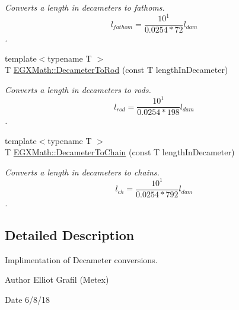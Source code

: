 \begin{DoxyCompactItemize}
\begin{DoxyCompactList}\small\item\em Converts a length in decameters to fathoms. \[ l_{fathom}= \frac{10^{1}}{0.0254 * 72} l_{dam} \]. \end{DoxyCompactList}\item 
{\footnotesize template$<$typename T $>$ }\\T \mbox{\hyperlink{group___e_g_x_math-_conversions-_length_conversions-_s_i-_decameter-_surveyors_ga0a6de708486617662fba474b67c8faa5}{E\+G\+X\+Math\+::\+Decameter\+To\+Rod}} (const T length\+In\+Decameter)
\begin{DoxyCompactList}\small\item\em Converts a length in decameters to rods. \[ l_{rod}= \frac{10^{1}}{0.0254 * 198} l_{dam} \]. \end{DoxyCompactList}\item 
{\footnotesize template$<$typename T $>$ }\\T \mbox{\hyperlink{group___e_g_x_math-_conversions-_length_conversions-_s_i-_decameter-_surveyors_ga7ede3a9605004deb5638075581637354}{E\+G\+X\+Math\+::\+Decameter\+To\+Chain}} (const T length\+In\+Decameter)
\begin{DoxyCompactList}\small\item\em Converts a length in decameters to chains. \[ l_{ch}= \frac{10^{1}}{0.0254 * 792} l_{dam} \]. \end{DoxyCompactList}\end{DoxyCompactItemize}


\subsection{Detailed Description}
Implimentation of Decameter conversions. 

\begin{DoxyAuthor}{Author}
Elliot Grafil (Metex) 
\end{DoxyAuthor}
\begin{DoxyDate}{Date}
6/8/18 
\end{DoxyDate}
